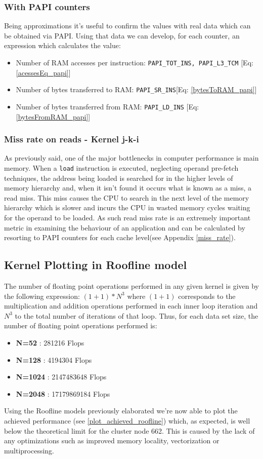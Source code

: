 \documentclass{article}
\begin{document}
\subsubsection{With PAPI counters}

Being approximations it's useful to confirm the values with real data which can be obtained via PAPI. Using that
data we can develop, for each counter, an expression which calculates the value:
\begin{itemize}
    \item Number of RAM accesses per instruction: \texttt{PAPI\_TOT\_INS, PAPI\_L3\_TCM} [Eq: \ref{acessesEq_papi}]
    \item Number of bytes transferred to RAM: \texttt{PAPI\_SR\_INS}[Eq: \ref{bytesToRAM_papi}]
    \item Number of bytes transferred from RAM: \texttt{PAPI\_LD\_INS} [Eq: \ref{bytesFromRAM_papi}]
\end{itemize}

\subsubsection{Miss rate on reads - Kernel j-k-i}
As previously said, one of the major bottlenecks in computer performance is main memory. When a \texttt{load} instruction is executed,
neglecting operand pre-fetch techniques, the address being loaded is searched for in the higher levels of memory hierarchy and, when it
isn't found it occurs what is known as a miss, a read miss. This miss causes the CPU to search in the next level of the memory hierarchy
which is slower and incurs the CPU in wasted memory cycles waiting for the operand to be loaded. As such read miss rate is an extremely 
important metric in examining the behaviour of an application and can be calculated by resorting to PAPI counters for each cache 
level(see Appendix \ref{miss_rate}).

\subsection{Kernel Plotting in Roofline model}
The number of floating point operations performed in any given kernel is given by the following expression: $ (1 + 1) * N^3$ 
where $(1+1)$ corresponds to the multiplication and addition operations performed in each inner loop iteration 
and $N^3$ to the total number of iterations of that loop.
Thus, for each data set size, the number of floating point operations performed is:
\begin{itemize}
    \item \textbf{N=52} : 281216 Flops 
    \item \textbf{N=128} : 4194304 Flops
    \item \textbf{N=1024} : 2147483648 Flops
    \item \textbf{N=2048} : 17179869184 Flops
\end{itemize}
Using the Roofline models previously elaborated we're now able to plot the achieved performance (see \ref{plot_achieved_roofline}) which, as expected, is well below the theoretical limit for the cluster node 662. This is caused by the lack
of any optimizations such as improved memory locality, vectorization or multiprocessing.
\end{document}
